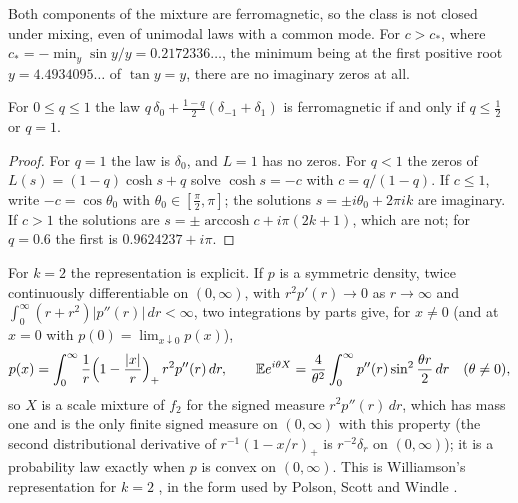 Both components of the mixture are ferromagnetic, so the class is not closed under mixing, even of unimodal laws with a common mode. For $c>c_*$, where $c_*=-\min_y\sin y/y=0.2172336\ldots$, the minimum being at the first positive root $y=4.4934095\ldots$ of $\tan y=y$, there are no imaginary zeros at all.

\begin{proposition}\label{fm:prop:spin1}
For $0\le q\le1$ the law $q\,\delta_0+\frac{1-q}2(\delta_{-1}+\delta_1)$ is ferromagnetic if and only if $q\le\frac12$ or $q=1$.
\end{proposition}

\begin{proof}
For $q=1$ the law is $\delta_0$, and $L=1$ has no zeros. For $q<1$ the zeros of $L(s)=(1-q)\cosh s+q$ solve $\cosh s=-c$ with $c=q/(1-q)$. If $c\le1$, write $-c=\cos\theta_0$ with $\theta_0\in[\frac\pi2,\pi]$; the solutions $s=\pm i\theta_0+2\pi ik$ are imaginary. If $c>1$ the solutions are $s=\pm\operatorname{arccosh}c+i\pi(2k+1)$, which are not; for $q=0.6$ the first is $0.9624237+i\pi$.
\end{proof}

For $k=2$ the representation is explicit. If $p$ is a symmetric density, twice continuously differentiable on $(0,\infty)$, with $r^2p'(r)\to0$ as $r\to\infty$ and $\int_0^\infty(r+r^2)|p''(r)|\,dr<\infty$, two integrations by parts give, for $x\ne0$ (and at $x=0$ with $p(0)=\lim_{x\downarrow0}p(x)$),
\[
p(x)=\int_0^\infty\frac1r\Big(1-\frac{|x|}r\Big)_+\,r^2p''(r)\,dr,\qquad\mathbb{E} e^{i\theta X}=\frac4{\theta^2}\int_0^\infty p''(r)\sin^2\frac{\theta r}2\,dr\quad(\theta\ne0),
\]
so $X$ is a scale mixture of $f_2$ for the signed measure $r^2p''(r)\,dr$, which has mass one and is the only finite signed measure on $(0,\infty)$ with this property (the second distributional derivative of $r^{-1}(1-x/r)_+$ is $r^{-2}\delta_r$ on $(0,\infty)$); it is a probability law exactly when $p$ is convex on $(0,\infty)$. This is Williamson's representation for $k=2$ \cite{Williamson}, in the form used by Polson, Scott and Windle \cite[Section 2.2]{PSW14}.

